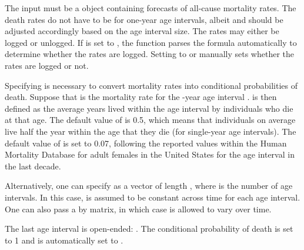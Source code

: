 %
\begin{Details}\relax
The input must be a  object containing forecasts of all-cause mortality rates. The death rates do not have to be for one-year age intervals, albeit  and  should be adjusted accordingly based on the age interval size. The rates may either be logged or unlogged. If  is set to , the function parses the formula automatically to determine whether the rates are logged. Setting  to  or  manually sets whether the rates are logged or not.

Specifying  is necessary to convert mortality rates into conditional probabilities of death. Suppose that  is the mortality rate for the -year age interval \eqn{[x,x+n)}{}.  is then defined as the average years lived within the age interval \eqn{[x,x+n)}{} by individuals who die at that age. The default value of  is 0.5, which means that individuals on average live half the year within the age that they die (for single-year age intervals). The default value of  is set to 0.07, following the reported values within the Human Mortality Database for adult females in the United States for the \eqn{[0,1)}{} age interval in the last decade.

Alternatively, one can specify  as a vector of length , where  is the number of age intervals. In this case,  is assumed to be constant across time for each age interval. One can also pass a  by  matrix, in which case  is allowed to vary over time.

The last age interval is open-ended: \eqn{[x,\infty)}{}. The conditional probability of death is set to 1 and  is automatically set to .
\end{Details}
%
